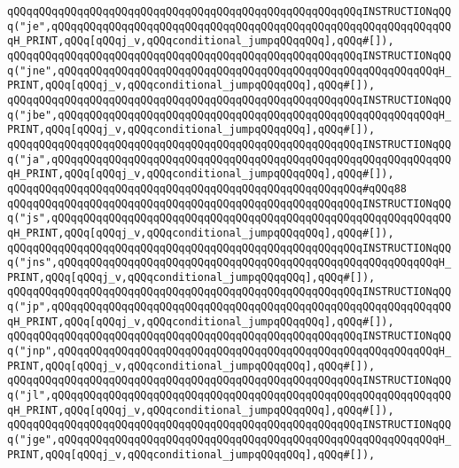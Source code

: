 \verb|qQQqqQQqqQQqqQQqqQQqqQQqqQQqqQQqqQQqqQQqqQQqqQQqqQQqqQQqINSTRUCTIONqQQq("je",qQQqqQQqqQQqqQQqqQQqqQQqqQQqqQQqqQQqqQQqqQQqqQQqqQQqqQQqqQQqqQQqH_PRINT,qQQq[qQQqj_v,qQQqconditional_jumpqQQqqQQq],qQQq#[]),|\newline
\verb|qQQqqQQqqQQqqQQqqQQqqQQqqQQqqQQqqQQqqQQqqQQqqQQqqQQqqQQqINSTRUCTIONqQQq("jne",qQQqqQQqqQQqqQQqqQQqqQQqqQQqqQQqqQQqqQQqqQQqqQQqqQQqqQQqqQQqH_PRINT,qQQq[qQQqj_v,qQQqconditional_jumpqQQqqQQq],qQQq#[]),|\newline
\verb|qQQqqQQqqQQqqQQqqQQqqQQqqQQqqQQqqQQqqQQqqQQqqQQqqQQqqQQqINSTRUCTIONqQQq("jbe",qQQqqQQqqQQqqQQqqQQqqQQqqQQqqQQqqQQqqQQqqQQqqQQqqQQqqQQqqQQqH_PRINT,qQQq[qQQqj_v,qQQqconditional_jumpqQQqqQQq],qQQq#[]),|\newline
\verb|qQQqqQQqqQQqqQQqqQQqqQQqqQQqqQQqqQQqqQQqqQQqqQQqqQQqqQQqINSTRUCTIONqQQq("ja",qQQqqQQqqQQqqQQqqQQqqQQqqQQqqQQqqQQqqQQqqQQqqQQqqQQqqQQqqQQqqQQqH_PRINT,qQQq[qQQqj_v,qQQqconditional_jumpqQQqqQQq],qQQq#[]),|\newline
\verb|qQQqqQQqqQQqqQQqqQQqqQQqqQQqqQQqqQQqqQQqqQQqqQQqqQQqqQQq#qQQq88|\newline
\verb|qQQqqQQqqQQqqQQqqQQqqQQqqQQqqQQqqQQqqQQqqQQqqQQqqQQqqQQqINSTRUCTIONqQQq("js",qQQqqQQqqQQqqQQqqQQqqQQqqQQqqQQqqQQqqQQqqQQqqQQqqQQqqQQqqQQqqQQqH_PRINT,qQQq[qQQqj_v,qQQqconditional_jumpqQQqqQQq],qQQq#[]),|\newline
\verb|qQQqqQQqqQQqqQQqqQQqqQQqqQQqqQQqqQQqqQQqqQQqqQQqqQQqqQQqINSTRUCTIONqQQq("jns",qQQqqQQqqQQqqQQqqQQqqQQqqQQqqQQqqQQqqQQqqQQqqQQqqQQqqQQqqQQqH_PRINT,qQQq[qQQqj_v,qQQqconditional_jumpqQQqqQQq],qQQq#[]),|\newline
\verb|qQQqqQQqqQQqqQQqqQQqqQQqqQQqqQQqqQQqqQQqqQQqqQQqqQQqqQQqINSTRUCTIONqQQq("jp",qQQqqQQqqQQqqQQqqQQqqQQqqQQqqQQqqQQqqQQqqQQqqQQqqQQqqQQqqQQqqQQqH_PRINT,qQQq[qQQqj_v,qQQqconditional_jumpqQQqqQQq],qQQq#[]),|\newline
\verb|qQQqqQQqqQQqqQQqqQQqqQQqqQQqqQQqqQQqqQQqqQQqqQQqqQQqqQQqINSTRUCTIONqQQq("jnp",qQQqqQQqqQQqqQQqqQQqqQQqqQQqqQQqqQQqqQQqqQQqqQQqqQQqqQQqqQQqH_PRINT,qQQq[qQQqj_v,qQQqconditional_jumpqQQqqQQq],qQQq#[]),|\newline
\verb|qQQqqQQqqQQqqQQqqQQqqQQqqQQqqQQqqQQqqQQqqQQqqQQqqQQqqQQqINSTRUCTIONqQQq("jl",qQQqqQQqqQQqqQQqqQQqqQQqqQQqqQQqqQQqqQQqqQQqqQQqqQQqqQQqqQQqqQQqH_PRINT,qQQq[qQQqj_v,qQQqconditional_jumpqQQqqQQq],qQQq#[]),|\newline
\verb|qQQqqQQqqQQqqQQqqQQqqQQqqQQqqQQqqQQqqQQqqQQqqQQqqQQqqQQqINSTRUCTIONqQQq("jge",qQQqqQQqqQQqqQQqqQQqqQQqqQQqqQQqqQQqqQQqqQQqqQQqqQQqqQQqqQQqH_PRINT,qQQq[qQQqj_v,qQQqconditional_jumpqQQqqQQq],qQQq#[]),|\newline
